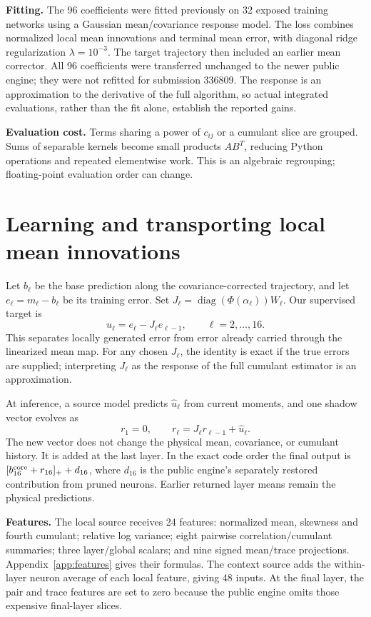 \documentclass[10pt]{article}
\newcommand{\diag}{\operatorname{diag}}
\newcommand{\sectionpage}[1]{\clearpage\section{#1}}
\begin{document}
\textbf{Fitting.} The 96 coefficients were fitted previously on 32 exposed
training networks using a Gaussian mean/covariance response model. The loss
combines normalized local mean innovations and terminal mean error, with
diagonal ridge regularization \(\lambda=10^{-3}\). The target trajectory then
included an earlier mean corrector. All 96 coefficients were transferred
unchanged to the newer public engine; they were not refitted for submission
336809. The response is an approximation to the derivative of the full
algorithm, so actual integrated evaluations, rather than the fit alone,
establish the reported gains.

\textbf{Evaluation cost.} Terms sharing a power of \(c_{ij}\) or a cumulant
slice are grouped. Sums of separable kernels become small products
\(A B^T\), reducing Python operations and repeated elementwise work. This is
an algebraic regrouping; floating-point evaluation order can change.

\sectionpage{Learning and transporting local mean innovations}
Let \(b_\ell\) be the base prediction along the covariance-corrected trajectory,
and let \(e_\ell=m_\ell-b_\ell\) be its training error. Set
\(J_\ell=\diag(\Phi(\alpha_\ell))W_\ell\). Our supervised target is
\begin{equation}\label{eq:innovation}
 u_\ell=e_\ell-J_\ell e_{\ell-1},\qquad \ell=2,\ldots,16.
\end{equation}
This separates locally generated error from error already carried through
the linearized mean map. For any chosen \(J_\ell\), the identity is exact if
the true errors are supplied; interpreting \(J_\ell\) as the response of the
full cumulant estimator is an approximation.

At inference, a source model predicts \(\widehat u_\ell\) from current
moments, and one shadow vector evolves as
\begin{equation}\label{eq:shadow}
 r_1=0,\qquad r_\ell=J_\ell r_{\ell-1}+\widehat u_\ell.
\end{equation}
The new vector does not change the physical mean, covariance, or cumulant
history. It is added at the last layer. In the exact code order the final
output is \([b_{16}^{\rm core}+r_{16}]_++d_{16}\), where \(d_{16}\) is the
public engine's separately restored contribution from pruned neurons. Earlier
returned layer means remain the physical predictions.

\textbf{Features.} The local source receives 24 features: normalized mean,
skewness and fourth cumulant; relative log variance; eight pairwise
correlation/cumulant summaries; three layer/global scalars; and nine signed
mean/trace projections. Appendix~\ref{app:features} gives their formulas.
The context source adds the within-layer neuron average of each local feature,
giving 48 inputs. At the final layer, the pair and trace features are set to
zero because the public engine omits those expensive final-layer slices.
\end{document}
